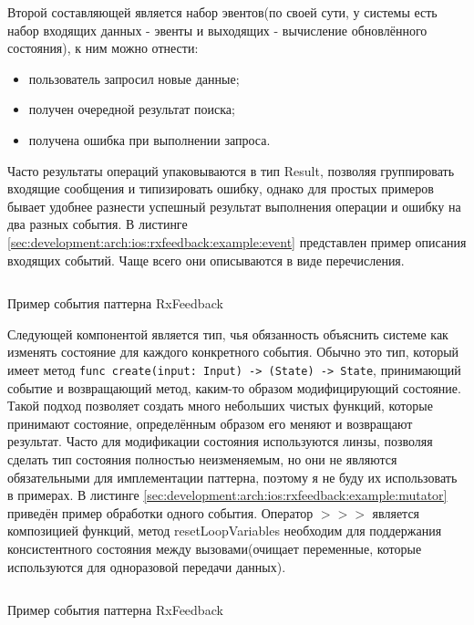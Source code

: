 Второй составляющей является набор эвентов(по своей сути, у системы есть набор входящих данных - эвенты и выходящих - вычисление обновлённого состояния), к ним можно отнести:

\begin{itemize}
  \item пользователь запросил новые данные;
  \item получен очередной результат поиска;
  \item получена ошибка при выполнении запроса.
\end{itemize}

Часто результаты операций упаковываются в тип Result, позволяя группировать входящие сообщения и типизировать ошибку, однако для простых примеров бывает удобнее разнести успешный результат выполнения операции и ошибку на два разных события. В листинге \ref{sec:development:arch:ios:rxfeedback:example:event} представлен пример описания входящих событий. Чаще всего они описываются в виде перечисления.

\begin{code}
  \inputminted{swift}{inc/src/rx-feedback-event.swift}
   \caption{Пример события паттерна RxFeedback}
   \label{sec:development:arch:ios:rxfeedback:example:event}
\end{code}

Следующей компонентой является тип, чья обязанность объяснить системе как изменять состояние для каждого конкретного события. Обычно это тип, который имеет метод \texttt{func create(input: Input) -> (State) -> State}, принимающий событие и возвращающий метод, каким-то образом модифицирующий состояние. Такой подход позволяет создать много небольших чистых функций, которые принимают состояние, определённым образом его меняют и возвращают результат. Часто для модификации состояния используются линзы, позволяя сделать тип состояния полностью неизменяемым, но они не являются обязательными для имплементации паттерна, поэтому я не буду их использовать в примерах. В листинге \ref{sec:development:arch:ios:rxfeedback:example:mutator} приведён пример обработки одного события. Оператор \(>>>\) является композицией функций, метод resetLoopVariables необходим для поддержания консистентного состояния между вызовами(очищает переменные, которые используются для одноразовой передачи данных).

\begin{code}
  \inputminted{swift}{inc/src/rx-feedback-state-mutator.swift}
   \caption{Пример события паттерна RxFeedback}
   \label{sec:development:arch:ios:rxfeedback:example:mutator}
\end{code}


